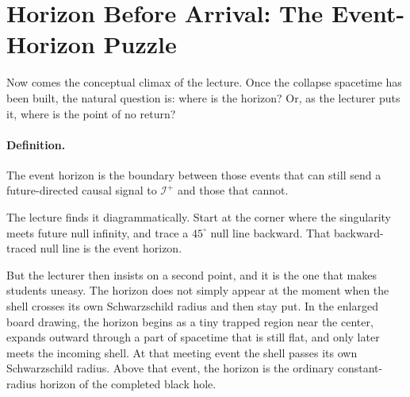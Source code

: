 \begin{classroomqa}
\end{classroomqa}

\section{Horizon Before Arrival: The Event-Horizon Puzzle}

Now comes the conceptual climax of the lecture. Once the collapse spacetime has been built, the natural question is: where is the horizon? Or, as the lecturer puts it, where is the point of no return?

\paragraph{Definition.} The event horizon is the boundary between those events that can still send a future-directed causal signal to \(\mathcal{I}^+\) and those that cannot.

The lecture finds it diagrammatically. Start at the corner where the singularity meets future null infinity, and trace a \(45^\circ\) null line backward. That backward-traced null line is the event horizon.

But the lecturer then insists on a second point, and it is the one that makes students uneasy. The horizon does not simply appear at the moment when the shell crosses its own Schwarzschild radius and then stay put. In the enlarged board drawing, the horizon begins as a tiny trapped region near the center, expands outward through a part of spacetime that is still flat, and only later meets the incoming shell. At that meeting event the shell passes its own Schwarzschild radius. Above that event, the horizon is the ordinary constant-radius horizon of the completed black hole.

